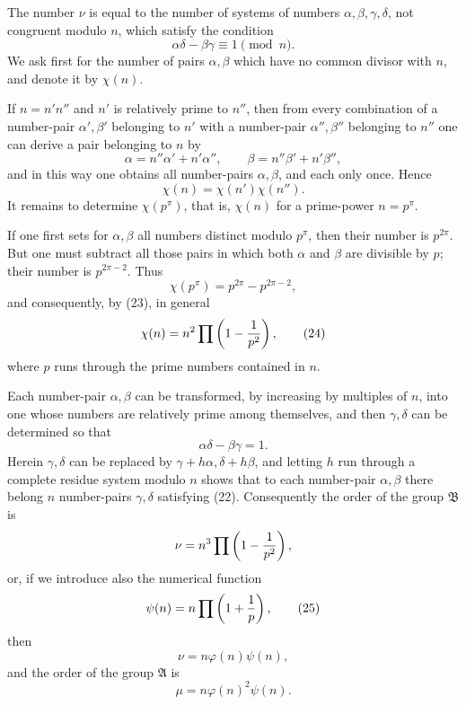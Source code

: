 \documentclass[11pt]{article}
\begin{document}
The number $\nu$ is equal to the number of systems of numbers $\alpha,\beta,\gamma,\delta$,
not congruent modulo $n$, which satisfy the condition
\begin{equation}
 \alpha\delta-\beta\gamma\equiv1\pmod n.
\tag{22}
\end{equation}
We ask first for the number of pairs $\alpha,\beta$ which have no common divisor with $n$,
and denote it by $\chi(n)$.

If $n=n'n''$ and $n'$ is relatively prime to $n''$, then from every combination of a
number-pair $\alpha',\beta'$ belonging to $n'$ with a number-pair $\alpha'',\beta''$ belonging
to $n''$ one can derive a pair belonging to $n$ by
\[
 \alpha=n''\alpha'+n'\alpha'',
 \qquad
 \beta=n''\beta'+n'\beta'',
\]
and in this way one obtains all number-pairs $\alpha,\beta$, and each only once. Hence
\begin{equation}
 \chi(n)=\chi(n')\chi(n'').
\tag{23}
\end{equation}
It remains to determine $\chi(p^\pi)$, that is, $\chi(n)$ for a prime-power
$n=p^\pi$.

If one first sets for $\alpha,\beta$ all numbers distinct modulo $p^\pi$, then their number is
$p^{2\pi}$. But one must subtract all those pairs in which both $\alpha$ and $\beta$ are
divisible by $p$; their number is $p^{2\pi-2}$. Thus
\[
 \chi(p^\pi)=p^{2\pi}-p^{2\pi-2},
\]
and consequently, by (23), in general
\begin{equation}
 \chi(n)=n^2\prod\left(1-{1\over p^2}\right),
\tag{24}
\end{equation}
where $p$ runs through the prime numbers contained in $n$.

Each number-pair $\alpha,\beta$ can be transformed, by increasing by multiples of $n$, into
one whose numbers are relatively prime among themselves, and then $\gamma,\delta$ can be
determined so that
\[
 \alpha\delta-\beta\gamma=1.
\]
Herein $\gamma,\delta$ can be replaced by $\gamma+h\alpha,\delta+h\beta$, and letting $h$
run through a complete residue system modulo $n$ shows that to each number-pair
$\alpha,\beta$ there belong $n$ number-pairs $\gamma,\delta$ satisfying (22). Consequently the
order of the group $\mathfrak B$ is
\[
 \nu=n^3\prod\left(1-{1\over p^2}\right),
\]
or, if we introduce also the numerical function
\begin{equation}
 \psi(n)=n\prod\left(1+{1\over p}\right),
\tag{25}
\end{equation}
then
\begin{equation}
 \nu=n\varphi(n)\psi(n),
\tag{26}
\end{equation}
and the order of the group $\mathfrak A$ is
\begin{equation}
 \mu=n\varphi(n)^2\psi(n).
\tag{27}
\end{equation}
\end{document}

